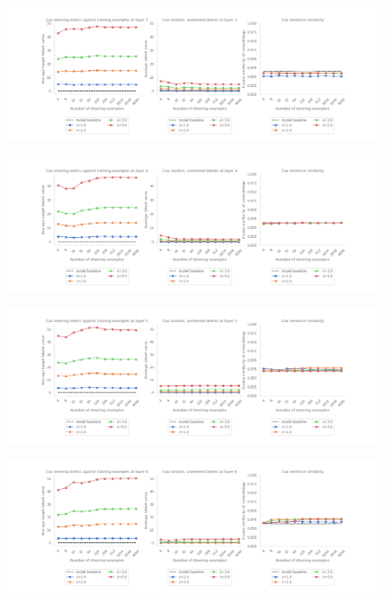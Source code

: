 \begin{figure}
    \centering
        \includegraphics[width=\textwidth]{figures/gpt2_sweep_3.png}
        \label{fig:3}
\end{figure}

\begin{figure}
    \centering
        \includegraphics[width=\textwidth]{figures/gpt2_sweep_4.png}
        \label{fig:4}
\end{figure}

\begin{figure}
    \centering
        \includegraphics[width=\textwidth]{figures/gpt2_sweep_5.png}
        \label{fig:5}
\end{figure}

\begin{figure}
    \centering
        \includegraphics[width=\textwidth]{figures/gpt2_sweep_6.png}
        \label{fig:6}
\end{figure}

